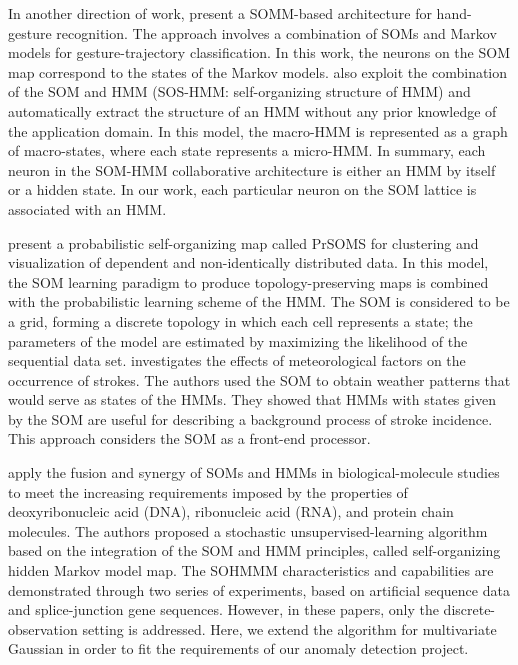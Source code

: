 In another direction of work, \citet{Caridakis2010} present a SOMM-based architecture for hand-gesture recognition. The approach involves a combination of SOMs and Markov models for gesture-trajectory classification. In this work, the neurons on the SOM map correspond to the states of the Markov models. \citet{Jaziri2011} also exploit the combination of the SOM and HMM (SOS-HMM: self-organizing structure of HMM) and automatically extract the structure of an HMM without any prior knowledge of the application domain. In this model, the macro-HMM is represented as a graph of macro-states, where each state represents a micro-HMM. In summary, each neuron in the SOM-HMM collaborative architecture is either an HMM by itself or a hidden state. In our work, each particular neuron on the SOM lattice is associated with an HMM.

\citet{Lebbah2015} present a probabilistic self-organizing map called PrSOMS for clustering and visualization of dependent and non-identically distributed data. In this model, the SOM learning paradigm to produce topology-preserving maps is combined with the probabilistic learning scheme of the HMM. The SOM is considered to be a grid, forming a discrete topology in which each cell represents a state; the parameters of the model are estimated by maximizing the likelihood of the sequential data set. \citet{Morimoto2016} investigates the effects of meteorological factors on the occurrence of strokes. The authors used the SOM to obtain weather patterns that would serve as states of the HMMs. They showed that HMMs with states given by the SOM are useful for describing a background process of stroke incidence. This approach considers the SOM as a front-end processor.

\citet{Ferles2008,Ferles2013,Ferles2017} apply the fusion and synergy of SOMs and HMMs in biological-molecule studies to meet the increasing requirements imposed by the properties of deoxyribonucleic acid (DNA), ribonucleic acid (RNA), and protein chain molecules. The authors proposed a stochastic unsupervised-learning algorithm based on the integration of the SOM and HMM principles, called self-organizing hidden Markov model map. The SOHMMM characteristics and capabilities are demonstrated through two series of experiments, based on artificial sequence data and splice-junction gene sequences. However, in these papers, only the discrete-observation setting is addressed. Here, we extend the algorithm for multivariate Gaussian in order to fit the requirements of our anomaly detection project.

